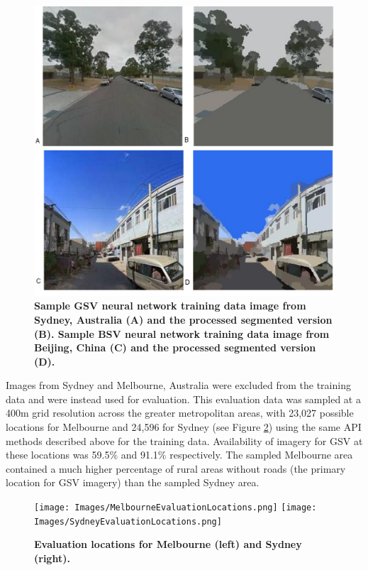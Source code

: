 \documentclass[Crown,sageh,times]{sagej}
\begin{document}
\begin{figure}[!htbp]
\includegraphics[scale=0.3]{Images/PlosOne/Fig4.png} 
\caption{\bf Sample GSV neural network training data image from Sydney, Australia \citep{GoogleMaps2017b} (A) and the processed segmented version (B). Sample BSV neural network training data image from Beijing, China \citep{Baidu2017} (C) and the processed segmented version (D).}    
 \label{fig:gsvbsv}  
\end{figure} 




Images from Sydney and Melbourne, Australia were excluded from the training data and were instead used for evaluation. This evaluation data was sampled at a 400m grid resolution across the greater metropolitan areas, with 23,027 possible locations for Melbourne and 24,596 for Sydney (see Figure \ref{fig:melsydevallocations}) using the same API methods described above for the training data. Availability of imagery for GSV at these locations was 59.5\% and 91.1\% respectively. The sampled Melbourne area contained a much higher percentage of rural areas without roads (the primary location for GSV imagery) than the sampled Sydney area.


\begin{figure}[!htbp]
\centering 
\texttt{[image: Images/MelbourneEvaluationLocations.png]}   
\texttt{[image: Images/SydneyEvaluationLocations.png]}    
\caption{\bf Evaluation locations for Melbourne (left) and Sydney (right).}    
 \label{fig:melsydevallocations}  
\end{figure} 
\end{document}
